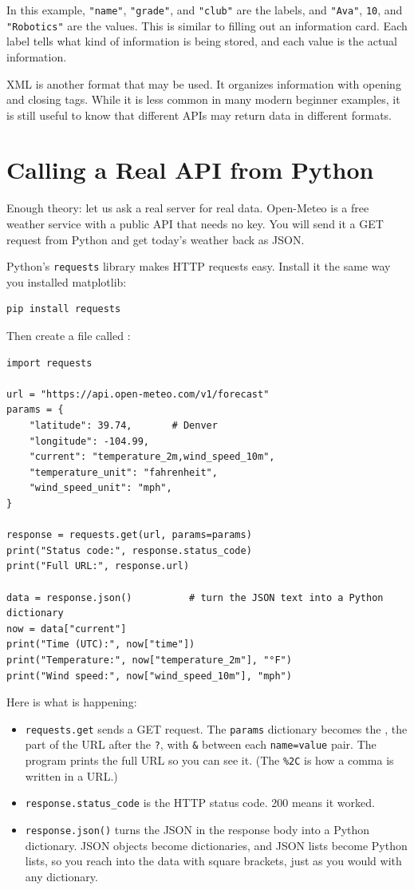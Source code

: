 In this example, \texttt{"name"}, \texttt{"grade"}, and \texttt{"club"}
are the labels, and \texttt{"Ava"}, \texttt{10}, and
\texttt{"Robotics"} are the values. This is similar to filling out an
information card. Each label tells what kind of information is being
stored, and each value is the actual information.

XML is another format that may be used. It organizes information with
opening and closing tags. While it is less common in many modern
beginner examples, it is still useful to know that different APIs may
return data in different formats.


\section{Calling a Real API from Python}

Enough theory: let us ask a real server for real data. Open-Meteo is a free weather service with a public API
that needs no key. You will send it a GET request from Python and get today's weather back as JSON.

Python's \verb|requests| library makes HTTP requests easy. Install it the same way you installed matplotlib:
\begin{verbatim}
pip install requests
\end{verbatim}

Then create a file called :

\begin{verbatim}
import requests

url = "https://api.open-meteo.com/v1/forecast"
params = {
    "latitude": 39.74,       # Denver
    "longitude": -104.99,
    "current": "temperature_2m,wind_speed_10m",
    "temperature_unit": "fahrenheit",
    "wind_speed_unit": "mph",
}

response = requests.get(url, params=params)
print("Status code:", response.status_code)
print("Full URL:", response.url)

data = response.json()          # turn the JSON text into a Python dictionary
now = data["current"]
print("Time (UTC):", now["time"])
print("Temperature:", now["temperature_2m"], "°F")
print("Wind speed:", now["wind_speed_10m"], "mph")
\end{verbatim}

Here is what is happening:
\begin{itemize}
\item \verb|requests.get| sends a GET request. The \verb|params| dictionary becomes the ,
the part of the URL after the \verb|?|, with \verb|&| between each \verb|name=value| pair. The program prints the
full URL so you can see it. (The \verb|%2C| is how a comma is written in a URL.)
\item \verb|response.status_code| is the HTTP status code. 200 means it worked.
\item \verb|response.json()| turns the JSON in the response body into a Python dictionary. JSON objects become
dictionaries, and JSON lists become Python lists, so you reach into the data with square brackets, just as you
would with any dictionary.
\end{itemize}

